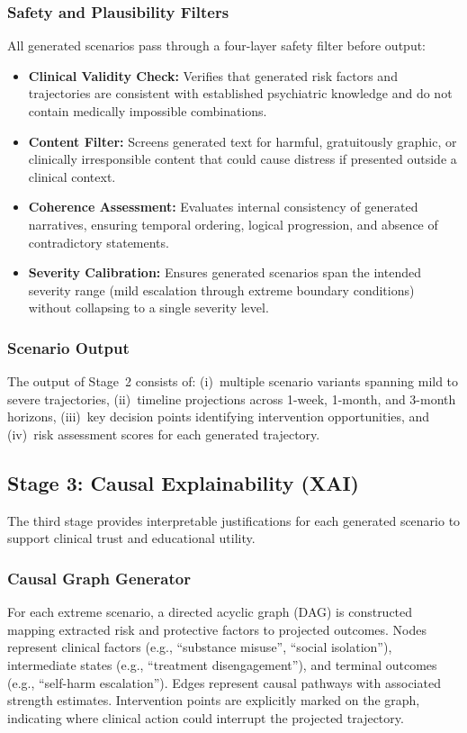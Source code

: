 \documentclass[conference]{IEEEtran}
\begin{document}
\subsubsection{Safety and Plausibility Filters}
All generated scenarios pass through a four-layer safety filter before output:
\begin{itemize}
\item \textbf{Clinical Validity Check:} Verifies that generated risk factors and trajectories are consistent with established psychiatric knowledge and do not contain medically impossible combinations.
\item \textbf{Content Filter:} Screens generated text for harmful, gratuitously graphic, or clinically irresponsible content that could cause distress if presented outside a clinical context.
\item \textbf{Coherence Assessment:} Evaluates internal consistency of generated narratives, ensuring temporal ordering, logical progression, and absence of contradictory statements.
\item \textbf{Severity Calibration:} Ensures generated scenarios span the intended severity range (mild escalation through extreme boundary conditions) without collapsing to a single severity level.
\end{itemize}

\subsubsection{Scenario Output}
The output of Stage~2 consists of: (i)~multiple scenario variants spanning mild to severe trajectories, (ii)~timeline projections across 1-week, 1-month, and 3-month horizons, (iii)~key decision points identifying intervention opportunities, and (iv)~risk assessment scores for each generated trajectory.

\subsection{Stage 3: Causal Explainability (XAI)}

The third stage provides interpretable justifications for each generated scenario to support clinical trust and educational utility.

\subsubsection{Causal Graph Generator}
For each extreme scenario, a directed acyclic graph (DAG) is constructed mapping extracted risk and protective factors to projected outcomes. Nodes represent clinical factors (e.g., ``substance misuse'', ``social isolation''), intermediate states (e.g., ``treatment disengagement''), and terminal outcomes (e.g., ``self-harm escalation''). Edges represent causal pathways with associated strength estimates. Intervention points are explicitly marked on the graph, indicating where clinical action could interrupt the projected trajectory.
\end{document}
